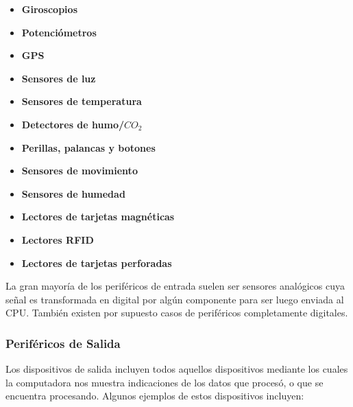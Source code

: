 \begin{minipage}{0.45\textwidth}
    \begin{itemize}
        \item \textbf{Giroscopios}
        \item \textbf{Potenciómetros}
        \item \textbf{GPS}
        \item \textbf{Sensores de luz}
        \item \textbf{Sensores de temperatura}
        \item \textbf{Detectores de humo/$CO_2$}
    \end{itemize}
\end{minipage}
\begin{minipage}{0.45\textwidth}
    \begin{itemize}
        \item \textbf{Perillas, palancas y botones}
        \item \textbf{Sensores de movimiento}
        \item \textbf{Sensores de humedad}
        \item \textbf{Lectores de tarjetas magnéticas}
        \item \textbf{Lectores RFID}
        \item \textbf{Lectores de tarjetas perforadas}
    \end{itemize}
\end{minipage}

La gran mayoría de los periféricos de entrada suelen ser sensores analógicos
cuya señal es transformada en digital por algún componente para ser luego
enviada al CPU. También existen por supuesto casos de periféricos completamente
digitales.

\subsubsection*{Periféricos de Salida}
\label{chap:computadoras:subsubsec:perifericos_salida}

Los dispositivos de salida incluyen todos aquellos dispositivos mediante los
cuales la computadora nos muestra indicaciones de los datos que procesó, o que
se encuentra procesando.\autocite[p. 352]{laplante_2000} Algunos ejemplos de
estos dispositivos incluyen:

